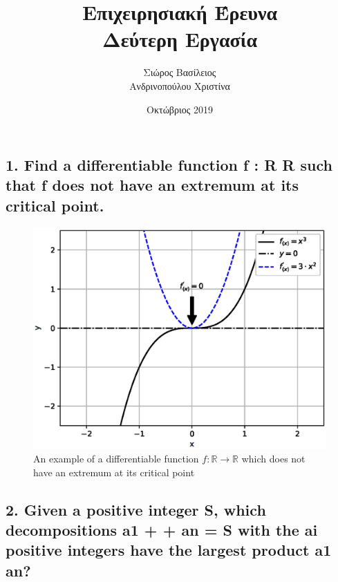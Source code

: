 \documentclass[12pt]{article}
\title{\hugeΑλγοριθμική Επιχειρησιακή Έρευνα\\Δεύτερη Εργασία}
\author{Σιώρος Βασίλειος\\Ανδρινοπούλου Χριστίνα}
\date{Οκτώβριος 2019}
\newcommand{\R}{\mathbb{R}}
\begin{document}
\maketitle

\thispagestyle{empty}




\pagebreak

\subsection*{1. Find a differentiable function f : R R such that f does not have an extremum at its
critical point.}

\begin{figure}[hp]
    \centering
    \captionsetup{justification=centering}

    \includegraphics{cubic_figure}
    \caption{An example of a differentiable function \( f: \R \rightarrow \R \) which does not have an extremum at its critical point}
\end{figure}

\vspace{2in}


\pagebreak

\subsection*{2. Given a positive integer S, which decompositions
a1 + + an = S
with the ai positive integers have the largest product a1 an?}

\vspace{2in}
\end{document}
